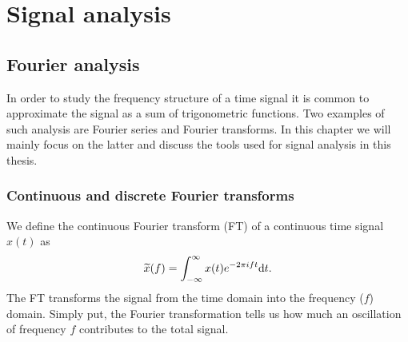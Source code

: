 \chapter{Signal analysis} \label{ch:signal}
\section{Fourier analysis}
In order to study the frequency structure of a time signal it is common 
to approximate the signal as a sum of trigonometric functions. Two examples
of such analysis are Fourier series and Fourier transforms. In this chapter we will mainly
focus on the latter and discuss the tools used for signal analysis in this thesis.
\subsection{Continuous and discrete Fourier transforms}
We define the continuous Fourier transform (FT) of a continuous time signal $x(t)$ as  
\begin{equation} \label{eqSA:cf}
\widetilde{x}(f) = \int_{-\infty}^{\infty} x(t) e^{-2 \pi i f t} \mathrm{d} t. 
\end{equation}
The FT transforms the signal from the time domain into the frequency ($f$) domain.
Simply put, the Fourier transformation tells us how much an oscillation of frequency $f$ contributes to the total signal. 


